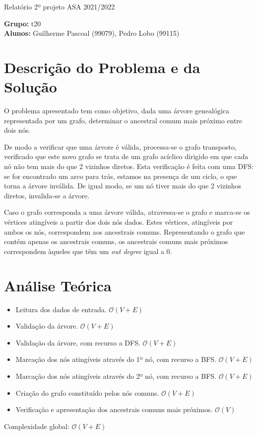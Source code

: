 \documentclass[12pt, letterpaper]{article}
\begin{document}
\begin{center}
	{\LARGE{Relatório 2º projeto ASA 2021/2022}}\\[\baselineskip]
\end{center}

\begin{flushleft}
	\textbf{Grupo:} t20\\
	\textbf{Alunos:} Guilherme Pascoal (99079), Pedro Lobo (99115)
\end{flushleft}


\section{Descrição do Problema e da Solução}

O problema apresentado tem como objetivo, dada uma árvore genealógica
representada por um grafo, determinar o ancestral comum mais próximo entre dois
nós.

De modo a verificar que uma árvore é válida, processa-se o grafo transposto,
verificado que este novo grafo se trata de um grafo acíclico dirigido em que cada
nó não tem mais do que 2 vizinhos diretos.
Esta verificação é feita com uma DFS: se for encontrado um arco para trás,
estamos na presença de um ciclo, o que torna a árvore inválida. De igual modo,
se um nó tiver mais do que 2 vizinhos diretos, invalida-se a árvore.

Caso o grafo corresponda a uma árvore válida, atravessa-se o grafo e marca-se os
vértices atingíveis a partir dos dois nós dados. Estes vértices, atingíveis por
ambos os nós, correspondem aos ancestrais comuns. Representando o grafo que
contém apenas os ancestrais comuns, os ancestrais comuns mais próximos
correspondem àqueles que têm um \emph{out degree} igual a 0.


\section{Análise Teórica}

\begin{itemize}
	\item Leitura dos dados de entrada. $\mathcal{O}(V + E)$
	\item Validação da árvore. $\mathcal{O}(V + E)$
	\item Validação da árvore, com recurso a DFS. $\mathcal{O}(V + E)$
	\item Marcação dos nós atingíveis através do 1º nó, com recurso a BFS. $\mathcal{O}(V + E)$
	\item Marcação dos nós atingíveis através do 2º nó, com recurso a BFS. $\mathcal{O}(V + E)$
	\item Criação do grafo constituído pelos nós comuns. $\mathcal{O}(V + E)$
	\item Verificação e apresentação dos ancestrais comuns mais próximos. $\mathcal{O}(V)$
\end{itemize}
Complexidade global: $\mathcal{O}(V + E)$
\end{document}
